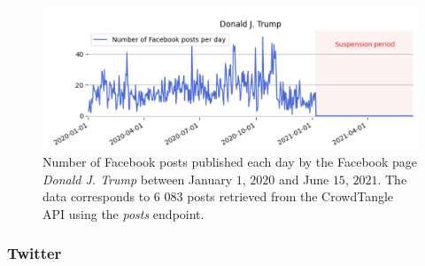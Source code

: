\documentclass[11pt,a4paper]{article}
\begin{document}
\begin{figure}
	\centering
		\begin{multicols}{1}
			\includegraphics[scale=0.2]{./img/fb/fig1_fb.png}
		\end{multicols}
	\caption{Number of Facebook posts published each day by the Facebook page {\it Donald J. Trump} between January $1$, $2020$ and June $15$, $2021$. The data corresponds to $6$ $083$ posts retrieved from the CrowdTangle API using the {\it posts} endpoint.}
	\label{fig1_fb}
\end{figure}

\subsubsection{Twitter}
\end{document}
